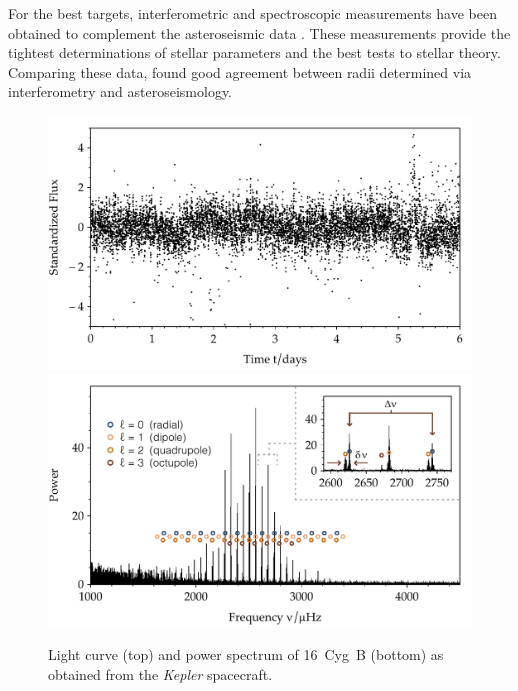 For the best targets, interferometric and spectroscopic measurements have been obtained to complement the asteroseismic data \citep[e.g.,][]{2010MNRAS.405.1907B, 2012MNRAS.423..122B, 2012ApJ...749..152M, 2013MNRAS.433.1262W}. 
These measurements provide the tightest determinations of stellar parameters and the best tests to stellar theory. 
Comparing these data, \citet{2012ApJ...760...32H} found good agreement between radii determined via interferometry and asteroseismology. 
\begin{figure}
    \centering
    \includegraphics[width=\linewidth]{figs/pgrams/cygb_lc.pdf}\\
    \includegraphics[width=\linewidth]{figs/pgrams/cygb_pgram.pdf}
    \caption[Power spectrum of 16~Cyg~B]{
        Light curve (top) and power spectrum of 16~Cyg~B (bottom) as obtained from the \emph{Kepler} spacecraft. 
}
\end{figure}
